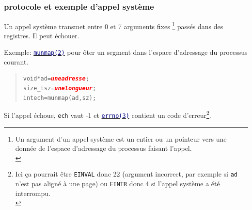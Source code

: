 \documentclass[lualatex,11pt,a4paper,svgnames,french]{beamer}
\newcommand{\clbrougras}[1]{{\textcolor{Red}{\textbf{#1}}}}
\begin{document}
\begin{frame}\frametitle{protocole et exemple d'appel système}
  Un appel système transmet entre 0 et 7 arguments fixes \footnote{Un
  argument d'un appel système est un entier ou un pointeur vers une
  donnée de l'espace d'adressage du processus faisant l'appel.\\} passés
  dans des registres. Il peut échouer.

  Exemple:
  \href{https://man7.org/linux/man-pages/man2/munmap.2.html}{\textcolor{Navy}{\texttt{munmap(2)}}}
  pour ôter un segment dans l'espace d'adressage du processus courant.

  \begin{quote}
  \begin{alltt}
    void* ad = \clbrougras{\textrm{\textit{une adresse}}};\\
    size\_t sz = \clbrougras{\textrm{\textit{une longueur}}};\\
    int ech = munmap(ad, sz);
  \end{alltt}
  \end{quote}
  
  \smallskip
  
  Si l'appel échoue, \texttt{ech} vaut -1 et
  \href{https://man7.org/linux/man-pages/man3/errno.3.html}{\textcolor{Navy}{\texttt{errno(3)}}}
  contient un code d'erreur\footnote{Ici ça pourrait être
  \texttt{EINVAL} donc 22 (argument incorrect, par exemple si
  \texttt{ad} n'est pas aligné à une page) ou \texttt{EINTR} donc 4 si
  l'appel système a été interrompu.\medskip\\}.

  \smallskip
\end{frame}
\end{document}
